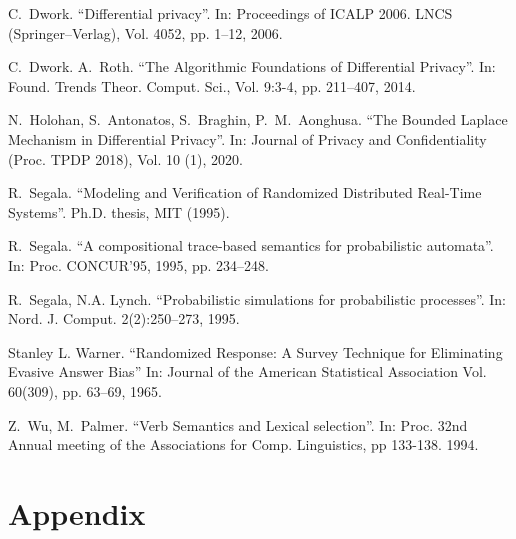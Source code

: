 \documentclass[pdflatex]{article}
\begin{document}
\begin{thebibliography}{99}
 C.~Dwork.
 \newblock ``Differential privacy''.
 \newblock  In: Proceedings of ICALP 2006. LNCS (Springer--Verlag), 
                        Vol. 4052, pp. 1--12, 2006.

  C.~Dwork. A.~Roth.
  \newblock ``The Algorithmic Foundations of Differential Privacy''.
  \newblock In: Found. Trends Theor. Comput. Sci., Vol. 9:3-4, pp. 211--407, 2014. 
  
N.~Holohan, S.~Antonatos, S.~Braghin, P.~M.~Aonghusa.
\newblock ``The Bounded Laplace Mechanism in Differential Privacy''.
 \newblock In: Journal of Privacy and Confidentiality (Proc. TPDP 2018), Vol. 10 (1), 2020. 

 R.~Segala.
 \newblock ``Modeling and Verification of Randomized Distributed
           Real-Time   Systems''.
 \newblock  Ph.D. thesis, MIT (1995).
           
 R.~Segala.
 \newblock ``A compositional trace-based semantics for probabilistic automata''.
 \newblock  In: Proc. CONCUR'95, 1995, pp. 234--248.

  R.~Segala, N.A. Lynch.
  \newblock ``Probabilistic simulations for probabilistic processes''.
  \newblock In: Nord. J. Comput. 2(2):250--273, 1995.
  
  Stanley L. Warner.
  \newblock ``Randomized Response: A Survey Technique for Eliminating Evasive Answer Bias''
  \newblock  In: Journal of the American Statistical Association
    Vol. 60(309), pp. 63--69, 1965. 
  
   Z.~Wu, M.~Palmer.
 \newblock ``Verb Semantics and Lexical selection''.
 \newblock  In: Proc. 32nd Annual meeting of the Associations for Comp. Linguistics,
    pp 133-138. 1994.
  
\end{thebibliography}


  
 \vspace*{-1mm}
  \section{ {\large Appendix}}~\label{WP-Metric}
  \vspace*{-1em}
  
\end{document}
